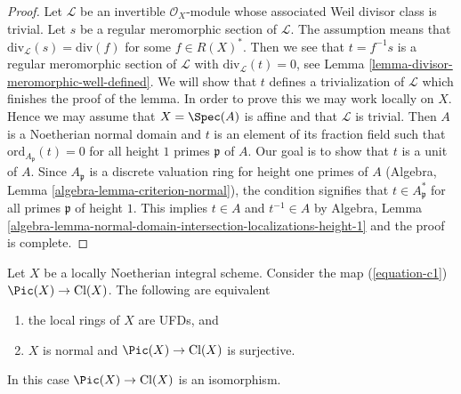 \begin{proof}
Let $\mathcal{L}$ be an invertible $\mathcal{O}_X$-module whose
associated Weil divisor class is trivial. Let $s$ be a regular
meromorphic section of $\mathcal{L}$. The assumption means that
$\text{div}_\mathcal{L}(s) = \text{div}(f)$ for some
$f \in R(X)^*$. Then we see that $t = f^{-1}s$ is a regular
meromorphic section of $\mathcal{L}$ with
$\text{div}_\mathcal{L}(t) = 0$, see
Lemma \ref{lemma-divisor-meromorphic-well-defined}.
We will show that $t$ defines a trivialization of $\mathcal{L}$
which finishes the proof of the lemma.
In order to prove this we may work locally on $X$.
Hence we may assume that $X = \Spec(A)$ is affine
and that $\mathcal{L}$ is trivial. Then $A$ is a Noetherian normal
domain and $t$ is an element of its fraction field
such that $\text{ord}_{A_\mathfrak p}(t) = 0$
for all height $1$ primes $\mathfrak p$ of $A$.
Our goal is to show that $t$ is a unit of $A$.
Since $A_\mathfrak p$ is a discrete valuation ring for height
one primes of $A$ (Algebra, Lemma \ref{algebra-lemma-criterion-normal}), the
condition signifies that $t \in A_\mathfrak p^*$ for all primes $\mathfrak p$
of height $1$. This implies $t \in A$ and $t^{-1} \in A$ by
Algebra, Lemma
\ref{algebra-lemma-normal-domain-intersection-localizations-height-1}
and the proof is complete.
\end{proof}

\begin{lemma}
\label{lemma-local-rings-UFD-c1-bijective}
Let $X$ be a locally Noetherian integral scheme. Consider the map
(\ref{equation-c1}) $\Pic(X) \to \text{Cl}(X)$.
The following are equivalent
\begin{enumerate}
\item the local rings of $X$ are UFDs, and
\item $X$ is normal and $\Pic(X) \to \text{Cl}(X)$
is surjective.
\end{enumerate}
In this case $\Pic(X) \to \text{Cl}(X)$ is an isomorphism.
\end{lemma}

